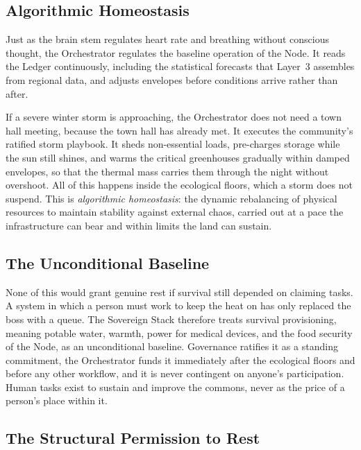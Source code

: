 \subsection{Algorithmic Homeostasis}

Just as the brain stem regulates heart rate and breathing without conscious thought, the Orchestrator regulates the baseline operation of the Node. It reads the Ledger continuously, including the statistical forecasts that Layer~3 assembles from regional data, and adjusts envelopes before conditions arrive rather than after.

If a severe winter storm is approaching, the Orchestrator does not need a town hall meeting, because the town hall has already met. It executes the community's ratified storm playbook. It sheds non-essential loads, pre-charges storage while the sun still shines, and warms the critical greenhouses gradually within damped envelopes, so that the thermal mass carries them through the night without overshoot. All of this happens inside the ecological floors, which a storm does not suspend. This is \textit{algorithmic homeostasis}: the dynamic rebalancing of physical resources to maintain stability against external chaos, carried out at a pace the infrastructure can bear and within limits the land can sustain.

\subsection{The Unconditional Baseline}

None of this would grant genuine rest if survival still depended on claiming tasks. A system in which a person must work to keep the heat on has only replaced the boss with a queue. The Sovereign Stack therefore treats survival provisioning, meaning potable water, warmth, power for medical devices, and the food security of the Node, as an unconditional baseline. Governance ratifies it as a standing commitment, the Orchestrator funds it immediately after the ecological floors and before any other workflow, and it is never contingent on anyone's participation. Human tasks exist to sustain and improve the commons, never as the price of a person's place within it.

\subsection{The Structural Permission to Rest}

